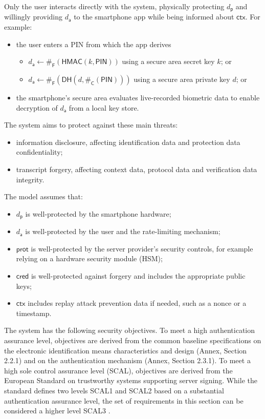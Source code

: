\documentclass[a4paper]{article}
\begin{document}
Only the user interacts directly with the system, physically protecting $d_\mathsf{p}$ and willingly providing $d_\mathsf{a}$ to the smartphone app while being informed about $\mathsf{ctx}$. For example:
\begin{itemize}
\item the user enters a PIN from which the app derives
	\begin{itemize}
	\item $d_\mathsf{a}\leftarrow\#_\mathsf F(\mathsf{HMAC}(k,\mathsf{PIN}))$ using a secure area secret key $k$; or
	\item $d_\mathsf{a}\leftarrow\#_\mathsf F(\mathsf{DH}(d,\#_\mathsf C(\mathsf{PIN})))$ using a secure area private key $d$; or
	\end{itemize}
\item the smartphone’s secure area evaluates live-recorded biometric data to enable decryption of $d_\mathsf{a}$ from a local key store.
\end{itemize}

The system aims to protect against these main threats:
\begin{itemize}
\item information disclosure, affecting identification data and protection data confidentiality;
\item transcript forgery, affecting context data, protocol data and verification data integrity.
\end{itemize}

The model assumes that:
\begin{itemize}
\item $d_\mathsf{p}$ is well-protected by the smartphone hardware;
\item $d_\mathsf{a}$ is well-protected by the user and the rate-limiting mechanism;
\item $\mathsf{prot}$ is well-protected by the server provider’s security controls, for example relying on a hardware security module (HSM);
\item $\mathsf{cred}$ is well-protected against forgery and includes the appropriate public keys;
\item $\mathsf{ctx}$ includes replay attack prevention data if needed, such as a nonce or a timestamp.
\end{itemize}

The system has the following security objectives. To meet a high authentication assurance level, objectives are derived from the common baseline specifications \cite{EU2015-1502} on the electronic identification means characteristics and design (Annex, Section 2.2.1) and on the authentication mechanism (Annex, Section 2.3.1). To meet a high sole control assurance level (SCAL), objectives are derived from the European Standard \cite{EN419241-1:2018} on trustworthy systems supporting server signing. While the standard defines two levels SCAL1 and SCAL2 based on a substantial authentication assurance level, the set of requirements in this section can be considered a higher level SCAL3 \cite{SCAL3}.
\end{document}
